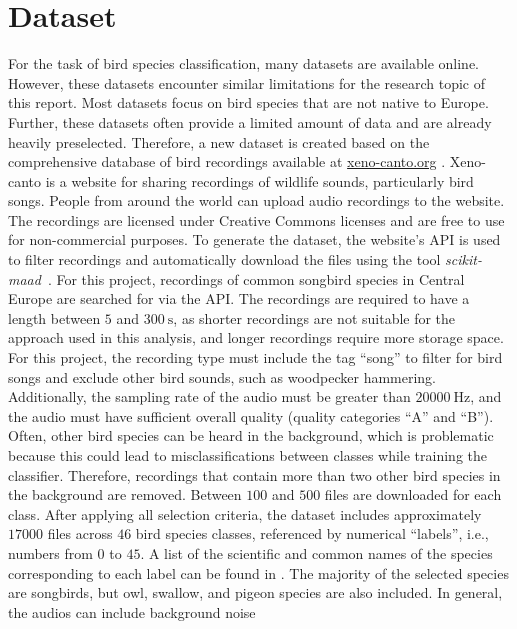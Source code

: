 \section{Dataset}
\label{sec:dataset}
For the task of bird species classification, many datasets are available online. 
However, these datasets encounter similar limitations for the research topic of this report. Most datasets focus on bird species that are not native to Europe.
Further, these datasets often provide a limited amount of data and are already heavily preselected. 
Therefore, a new dataset is created based on the comprehensive database of bird recordings available at \href{https://xeno-canto.org/}{xeno-canto.org} \cite{xeno-canto}. 
Xeno-canto is a website for sharing recordings of wildlife sounds, particularly bird songs. People from around the world can upload audio recordings to the website. The recordings 
are licensed under Creative Commons licenses and are free to use for non-commercial purposes.
To generate the dataset, the website's API is used to filter recordings and automatically download the files using the tool \textit{scikit-maad}~\cite{scikit-maad}.
For this project, recordings of common songbird species in Central Europe are searched for via the API. 
The recordings are required to have a length between $\num{5}$ and $\qty{300}{\second}$, as shorter recordings are not suitable for the approach used in this analysis, 
and longer recordings require more storage space. For this project, the recording type must include the tag \enquote{song} to filter for bird songs and exclude other bird sounds, 
such as woodpecker hammering.
Additionally, the sampling rate of the audio must be greater than $\qty{20000}{\hertz}$, and the audio must have sufficient overall quality 
(quality categories \enquote{A} and \enquote{B}). Often, other bird species can be heard in the background, which is problematic because this could lead to misclassifications between 
classes while training the classifier. Therefore, recordings that contain more than two other bird species in the background are removed.
Between $\num{100}$ and $\num{500}$ files are downloaded for each class. After applying all selection criteria, the dataset includes approximately $\num{17000}$ files across 
$\num{46}$ bird species classes, referenced by numerical \enquote{labels}, i.e., numbers from $\num{0}$ to $\num{45}$.
A list of the scientific and common names of the species corresponding to each label can be found in . 
The majority of the selected species are songbirds, but owl, swallow, and pigeon species are also included. In general, the audios can include background noise 
